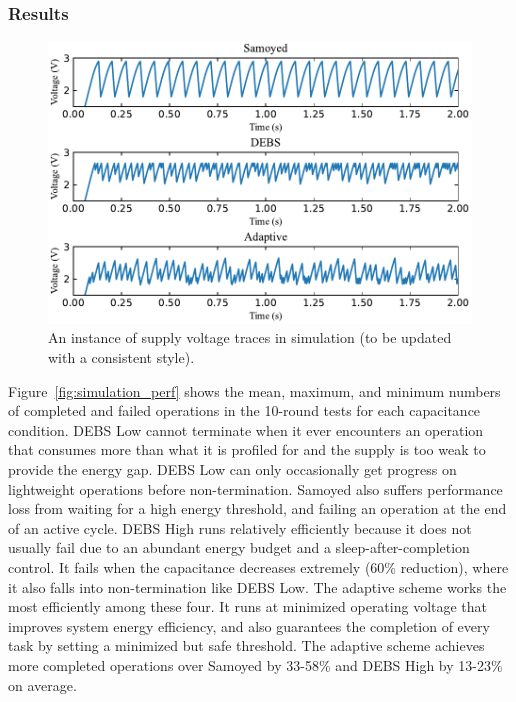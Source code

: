 \subsubsection{Results}

% 
% 

%




\begin{figure}[!t]
    \centering
    \includegraphics[width=\columnwidth]{ch5_optic/figures/voltage_traces.pdf}
    \caption{An instance of supply voltage traces in simulation (to be updated with a consistent style). }
    \label{fig:simulation_voltage}
\end{figure}



Figure~\ref{fig:simulation_perf} shows the mean, maximum, and minimum numbers of completed and failed operations in the 10-round tests for each capacitance condition. 
DEBS Low cannot terminate when it ever encounters an operation that consumes more than what it is profiled for and the supply is too weak to provide the energy gap. 
DEBS Low can only occasionally get progress on lightweight operations before non-termination. 
Samoyed also suffers performance loss from waiting for a high energy threshold, and failing an operation at the end of an active cycle. 
DEBS High runs relatively efficiently because it does not usually fail due to an abundant energy budget and a sleep-after-completion control. 
It fails when the capacitance decreases extremely (60\% reduction), where it also falls into non-termination like DEBS Low.  
The adaptive scheme works the most efficiently among these four.
It runs at minimized operating voltage that improves system energy efficiency, and also guarantees the completion of every task by setting a minimized but safe threshold.
The adaptive scheme achieves more completed operations over Samoyed by 33-58\% and DEBS High by 13-23\% on average.

